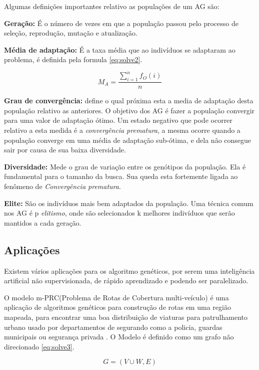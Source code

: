  Algumas definições importantes relativo as populações de um AG são:
 
 \textbf{Geração:} É o número de vezes em que a população passou pelo processo de seleção, reprodução, mutação e atualização.

\textbf{Média de adaptação:} É a taxa média que ao indivíduos se adaptaram ao problema, é definida pela formula \ref{eq:solve2}. 

\begin{equation} \label{eq:solve2}
M_A = \frac{ \sum_{i=1}^{n} f_O(i) }{n}
\end{equation}


\textbf{Grau de convergência:} define o qual próxima esta a media de adaptação desta população relativo as anteriores. O objetivo dos AG é fazer a população convergir para uma valor de adaptação ótimo.
Um estado negativo que pode ocorrer relativo a esta medida é a \textit{convergência prematura}, a mesma ocorre quando a população converge em uma média de adaptação sub-ótima, e dela não consegue sair por causa de sua baixa diversidade.

\textbf{Diversidade:} Mede o grau de variação entre os genótipos da população. Ela é fundamental para o tamanho da busca.
Sua queda esta fortemente ligada ao fenômeno de \textit{Convergência prematura}.

\textbf{Elite:} São os indivíduos mais bem adaptados da população. Uma técnica comum nos AG é p \textit{elitismo}, onde são selecionados k melhores indivíduos que serão mantidos a cada geração.

\subsection{Aplicações}
Existem vários aplicações para os algoritmo genéticos, por serem uma inteligência artificial não supervisionada, de rápido aprendizado e podendo ser paralelizado.

O modelo m-PRC(Problema de Rotas de Cobertura multi-veículo) é uma aplicação de algoritmos genéticos para construção de rotas em uma região mapeada, para encontrar uma boa distribuição de viaturas para patrulhamento urbano usado por departamentos de segurando como a policia, guardas municipais ou segurança privada \cite{Washington}. 
O Modelo é definido como um grafo não direcionado \ref{eq:solve3}. 

\begin{equation} \label{eq:solve3}
G=(V\cup W, E)
\end{equation}

